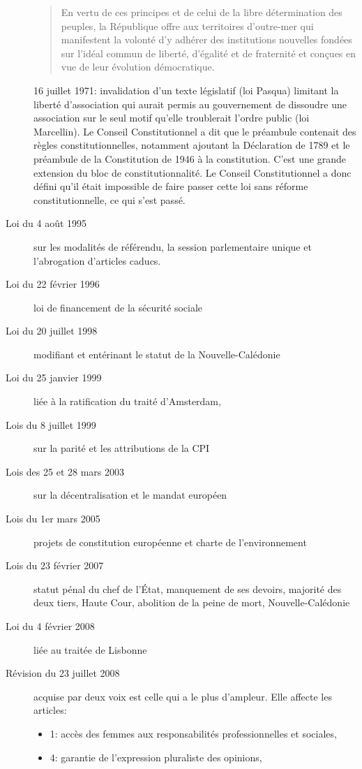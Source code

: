 \documentclass[math]{cours}
\begin{document}
\begin{description}
\begin{quote}
En vertu de ces principes et de celui de la libre détermination des peuples, la République offre aux territoires d'outre-mer qui manifestent la volonté d'y adhérer des institutions nouvelles fondées sur l'idéal commun de liberté, d'égalité et de fraternité et conçues en vue de leur évolution démocratique.
		\end{quote}
		16 juillet 1971: invalidation d'un texte législatif (loi Pasqua) limitant la liberté d'association qui aurait permis au gouvernement de dissoudre une association sur le seul motif qu'elle troublerait l'ordre public (loi Marcellin).
		Le Conseil Constitutionnel a dit que le préambule contenait des règles constitutionnelles, notamment ajoutant la Déclaration de 1789 et le préambule de la Constitution de 1946 à la constitution.
		C'est une grande extension du bloc de constitutionnalité.
		Le Conseil Constitutionnel a donc défini qu'il était impossible de faire passer cette loi sans réforme constitutionnelle, ce qui s'est passé.
	\item[Loi du 4 août 1995] sur les modalités de référendu, la session parlementaire unique et l'abrogation d'articles caducs.
	\item[Loi du 22 février 1996] loi de financement de la sécurité sociale
	\item[Loi du 20 juillet 1998] modifiant et entérinant le statut de la Nouvelle-Calédonie
	\item[Loi du 25 janvier 1999] liée à la ratification du traité d'Amsterdam,
	\item[Lois du 8 juillet 1999] sur la parité et les attributions de la CPI
	\item[Lois des 25 et 28 mars 2003] sur la décentralisation et le mandat européen
	\item[Lois du 1er mars 2005] projets de constitution européenne et charte de l'environnement
	\item[Lois du 23 février 2007] statut pénal du chef de l'État, manquement de ses devoirs, majorité des deux tiers, Haute Cour, abolition de la peine de mort, Nouvelle-Calédonie
	\item[Loi du 4 février 2008] liée au traitée de Lisbonne
	\item[Révision du 23 juillet 2008] acquise par deux voix est celle qui a le plus d'ampleur.
		Elle affecte les articles:
		\begin{itemize}
			\item 1: accès des femmes aux responsabilités professionnelles et sociales,
			\item 4: garantie de l'expression pluraliste des opinions,

\end{itemize}
\end{description}
\end{document}

